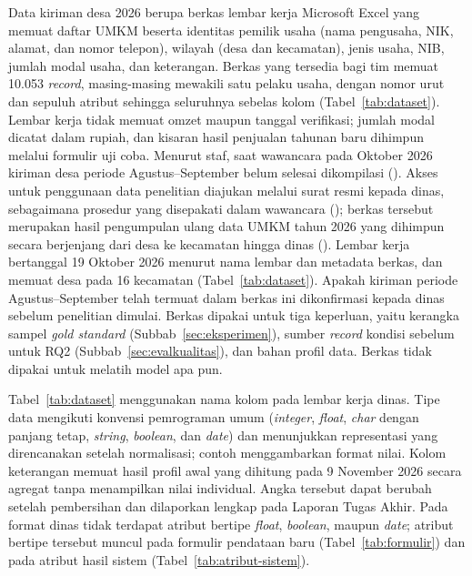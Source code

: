 Data kiriman desa 2026 berupa berkas lembar kerja Microsoft Excel yang memuat daftar UMKM beserta identitas pemilik usaha (nama pengusaha, NIK, alamat, dan nomor telepon), wilayah (desa dan kecamatan), jenis usaha, NIB, jumlah modal usaha, dan keterangan. Berkas yang tersedia bagi tim memuat 10.053 \textit{record}, masing-masing mewakili satu pelaku usaha, dengan nomor urut dan sepuluh atribut sehingga seluruhnya sebelas kolom (Tabel~\ref{tab:dataset}). Lembar kerja tidak memuat omzet maupun tanggal verifikasi; jumlah modal dicatat dalam rupiah, dan kisaran hasil penjualan tahunan baru dihimpun melalui formulir uji coba. Menurut staf, saat wawancara pada Oktober 2026 kiriman desa periode Agustus--September belum selesai dikompilasi (\lampstaf). Akses untuk penggunaan data penelitian diajukan melalui surat resmi kepada dinas, sebagaimana prosedur yang disepakati dalam wawancara (\lampstaf); berkas tersebut merupakan hasil pengumpulan ulang data UMKM tahun 2026 yang dihimpun secara berjenjang dari desa ke kecamatan hingga dinas (\lampstaf). Lembar kerja bertanggal 19 Oktober 2026 menurut nama lembar dan metadata berkas, dan memuat desa pada 16 kecamatan (Tabel~\ref{tab:dataset}). Apakah kiriman periode Agustus--September telah termuat dalam berkas ini dikonfirmasi kepada dinas sebelum penelitian dimulai. Berkas dipakai untuk tiga keperluan, yaitu kerangka sampel \textit{gold standard} (Subbab~\ref{sec:eksperimen}), sumber \textit{record} kondisi sebelum untuk RQ2 (Subbab~\ref{sec:evalkualitas}), dan bahan profil data. Berkas tidak dipakai untuk melatih model apa pun.

Tabel~\ref{tab:dataset} menggunakan nama kolom pada lembar kerja dinas. Tipe data mengikuti konvensi pemrograman umum (\textit{integer}, \textit{float}, \textit{char} dengan panjang tetap, \textit{string}, \textit{boolean}, dan \textit{date}) dan menunjukkan representasi yang direncanakan setelah normalisasi; contoh menggambarkan format nilai. Kolom keterangan memuat hasil profil awal yang dihitung pada 9 November 2026 secara agregat tanpa menampilkan nilai individual. Angka tersebut dapat berubah setelah pembersihan dan dilaporkan lengkap pada Laporan Tugas Akhir. Pada format dinas tidak terdapat atribut bertipe \textit{float}, \textit{boolean}, maupun \textit{date}; atribut bertipe tersebut muncul pada formulir pendataan baru (Tabel~\ref{tab:formulir}) dan pada atribut hasil sistem (Tabel~\ref{tab:atribut-sistem}).


